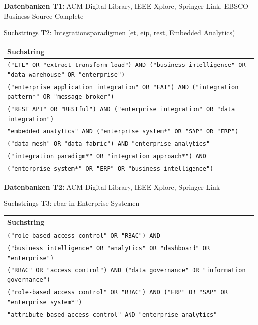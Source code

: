 \noindent\textbf{Datenbanken T1:} ACM Digital Library, IEEE Xplore, Springer Link, EBSCO Business Source Complete

\begin{batable}[label=tab:suchstrings-t2]{Suchstrings T2: Integrationsparadigmen (\gls{et}, \gls{eip}, \gls{rest}, Embedded Analytics)}
\small\setlength{\tabcolsep}{6pt}\renewcommand{\arraystretch}{1.4}
\begin{tabular}{|p{}|}
\hline
\textbf{Suchstring} \\
\hline
\texttt{("ETL" OR "extract transform load") AND ("business intelligence" OR "data warehouse" OR "enterprise")} \\[4pt]
\texttt{("enterprise application integration" OR "EAI") AND ("integration pattern*" OR "message broker")} \\[4pt]
\texttt{("REST API" OR "RESTful") AND ("enterprise integration" OR "data integration")} \\[4pt]
\texttt{"embedded analytics" AND ("enterprise system*" OR "SAP" OR "ERP")} \\[4pt]
\texttt{("data mesh" OR "data fabric") AND "enterprise analytics"} \\[4pt]
\texttt{("integration paradigm*" OR "integration approach*") AND} \\
\texttt{("enterprise system*" OR "ERP" OR "business intelligence")} \\
\hline
\end{tabular}
\end{batable}

\noindent\textbf{Datenbanken T2:} ACM Digital Library, IEEE Xplore, Springer Link

\begin{batable}[label=tab:suchstrings-t3]{Suchstrings T3: \gls{rbac} in Enterprise-Systemen}
\small\setlength{\tabcolsep}{6pt}\renewcommand{\arraystretch}{1.4}
\begin{tabular}{|p{}|}
\hline
\textbf{Suchstring} \\
\hline
\texttt{("role-based access control" OR "RBAC") AND} \\
\texttt{("business intelligence" OR "analytics" OR "dashboard" OR "enterprise")} \\[4pt]
\texttt{("RBAC" OR "access control") AND ("data governance" OR "information governance")} \\[4pt]
\texttt{("role-based access control" OR "RBAC") AND ("ERP" OR "SAP" OR "enterprise system*")} \\[4pt]
\texttt{"attribute-based access control" AND "enterprise analytics"} \\
\hline
\end{tabular}
\end{batable}

